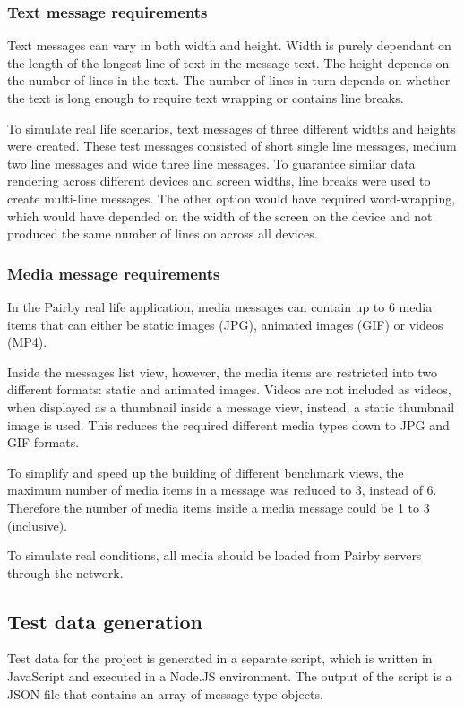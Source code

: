 \documentclass[a4paper,12pt]{article}
\begin{document}
\subsubsection*{Text message requirements}
Text messages can vary in both width and height. Width is purely dependant on the length of the longest line of text in
the message text. The height depends on the number of lines in the text. The number of lines in turn depends on whether
the text is long enough to require text wrapping or contains line breaks.

To simulate real life scenarios, text messages of three different widths and heights were created. These test messages
consisted of short single line messages, medium two line messages and wide three line messages. To guarantee similar
data rendering across different devices and screen widths, line breaks were used to create multi-line messages. The
other option would have required word-wrapping, which would have depended on the width of the screen on the device
and not produced the same number of lines on across all devices.

\subsubsection*{Media message requirements}
In the Pairby real life application, media messages can contain up to 6 media items that can either be static images (JPG),
animated images (GIF) or videos (MP4).

Inside the messages list view, however, the media items are restricted into two different formats: static and animated
images. Videos are not included as videos, when displayed as a thumbnail inside a message view, instead, a static thumbnail
image is used. This reduces the required different media types down to JPG and GIF formats.

To simplify and speed up the building of different benchmark views, the maximum number of media items in a message
was reduced to 3, instead of 6. Therefore the number of media items inside a media message could be 1 to 3 (inclusive).

To simulate real conditions, all media should be loaded from Pairby servers through the network.

\subsection{Test data generation}
Test data for the project is generated in a separate script, which is written in JavaScript and executed in a
Node.JS environment. The output of the script is a JSON file that contains an array of message type objects.
\end{document}
